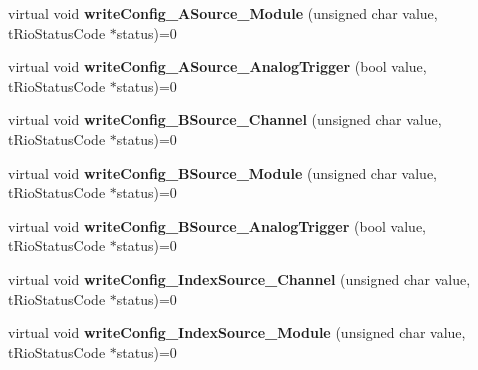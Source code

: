 \begin{DoxyCompactItemize}
\item 
\hypertarget{classnFPGA_1_1nFRC__2012__1__6__4_1_1tEncoder_a4d2380a7752faa45b0afdb3c3f92474f}{
virtual void {\bfseries writeConfig\_\-ASource\_\-Module} (unsigned char value, tRioStatusCode $\ast$status)=0}
\label{classnFPGA_1_1nFRC__2012__1__6__4_1_1tEncoder_a4d2380a7752faa45b0afdb3c3f92474f}

\item 
\hypertarget{classnFPGA_1_1nFRC__2012__1__6__4_1_1tEncoder_ab337af09776a63fb64d309b715f9b5d0}{
virtual void {\bfseries writeConfig\_\-ASource\_\-AnalogTrigger} (bool value, tRioStatusCode $\ast$status)=0}
\label{classnFPGA_1_1nFRC__2012__1__6__4_1_1tEncoder_ab337af09776a63fb64d309b715f9b5d0}

\item 
\hypertarget{classnFPGA_1_1nFRC__2012__1__6__4_1_1tEncoder_a48b5143f0096d4488873b598382e6296}{
virtual void {\bfseries writeConfig\_\-BSource\_\-Channel} (unsigned char value, tRioStatusCode $\ast$status)=0}
\label{classnFPGA_1_1nFRC__2012__1__6__4_1_1tEncoder_a48b5143f0096d4488873b598382e6296}

\item 
\hypertarget{classnFPGA_1_1nFRC__2012__1__6__4_1_1tEncoder_a8bea9f36ae458ba4689ac98b9535da2a}{
virtual void {\bfseries writeConfig\_\-BSource\_\-Module} (unsigned char value, tRioStatusCode $\ast$status)=0}
\label{classnFPGA_1_1nFRC__2012__1__6__4_1_1tEncoder_a8bea9f36ae458ba4689ac98b9535da2a}

\item 
\hypertarget{classnFPGA_1_1nFRC__2012__1__6__4_1_1tEncoder_a39f7c75cc03f1b10692ad83e6dad42fd}{
virtual void {\bfseries writeConfig\_\-BSource\_\-AnalogTrigger} (bool value, tRioStatusCode $\ast$status)=0}
\label{classnFPGA_1_1nFRC__2012__1__6__4_1_1tEncoder_a39f7c75cc03f1b10692ad83e6dad42fd}

\item 
\hypertarget{classnFPGA_1_1nFRC__2012__1__6__4_1_1tEncoder_a354b81d8787ee25a67ad5fcb3bcf717b}{
virtual void {\bfseries writeConfig\_\-IndexSource\_\-Channel} (unsigned char value, tRioStatusCode $\ast$status)=0}
\label{classnFPGA_1_1nFRC__2012__1__6__4_1_1tEncoder_a354b81d8787ee25a67ad5fcb3bcf717b}

\item 
\hypertarget{classnFPGA_1_1nFRC__2012__1__6__4_1_1tEncoder_ab75692d25c79950c79886d1b899dd2be}{
virtual void {\bfseries writeConfig\_\-IndexSource\_\-Module} (unsigned char value, tRioStatusCode $\ast$status)=0}
\label{classnFPGA_1_1nFRC__2012__1__6__4_1_1tEncoder_ab75692d25c79950c79886d1b899dd2be}


\end{DoxyCompactItemize}
